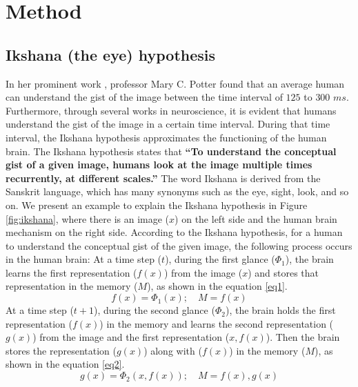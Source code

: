 \documentclass{article}
\begin{document}
\section{Method}
\label{method}
\subsection{Ikshana (the eye) hypothesis}
\label{3.1}
In her prominent work \cite{potter1975meaning}, professor Mary C. Potter found that an average human can understand the gist of the image between the time interval of $125$ to $300$ $ms$. Furthermore, through several works \cite{intraub1981rapid,rayner1998eye,schyns1994blobs,oliva2000diagnostic,oliva2001modeling,henderson2003human,evans2005perception,fei2007we} in neuroscience, it is evident that humans understand the gist of the image in a certain time interval. During that time interval, the Ikshana hypothesis approximates the functioning of the human brain.
The Ikshana hypothesis states that \textbf{``To  understand the conceptual gist of a given image, humans look at the image multiple times recurrently, at different scales.''} The word Ikshana is derived from the Sanskrit language, which has many synonyms such as the eye, sight, look, and so on. \newline
We present an example to explain the Ikshana hypothesis in Figure \ref{fig:ikshana}, where there is an image ($x$) on the left side and the human brain mechanism on the right side.
According to the Ikshana hypothesis, for a human to understand the conceptual gist of the given image, the following process occurs in the human brain: \newline
At a time step ($t$), during the first glance ($\Phi_{1}$), the brain learns the first representation ($f(x)$) from the image ($x$) and stores that representation in the memory ($M$), as shown in the equation \ref{eq1}.
\begin{equation} \label{eq1}  
 f(x) = \Phi_{1}(x)    ; \quad  M = f(x) 
\end{equation}
At a time step ($t+1$), during the second glance ($\Phi_{2}$), the brain holds the first representation ($f(x)$) in the memory and learns the second representation ($g(x)$) from the image and the first representation ($x,f(x)$). Then the brain stores the representation ($g(x)$) along with ($f(x)$) in the memory ($M$), as shown in the equation \ref{eq2}.
\begin{equation} \label{eq2}  
 g(x) = \Phi_{2}(x,f(x))   ;\quad   M = f(x),g(x)
\end{equation}
\end{document}
